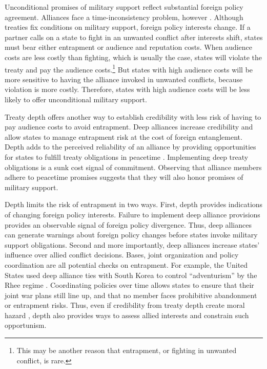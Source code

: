 \documentclass[12pt]{article}
\begin{document}
Unconditional promises of military support reflect substantial foreign policy agreement.
Alliances face a time-inconsistency problem, however \citep{LeedsSavun2007}. 
Although treaties fix conditions on military support, foreign policy interests change. 
If a partner calls on a state to fight in an unwanted conflict after interests shift, states must bear either entrapment or audience and reputation costs.
When audience costs are less costly than fighting, which is usually the case, states will violate the treaty and pay the audience costs.\footnote{This may be another reason that entrapment, or fighting in unwanted conflict, is rare.}    
But states with high audience costs will be more sensitive to having the alliance invoked in unwanted conflicts, because violation is more costly. 
Therefore, states with high audience costs will be less likely to offer unconditional military support. 


Treaty depth offers another way to establish credibility with less risk of having to pay audience costs to avoid entrapment. 
Deep alliances increase credibility and allow states to manage entrapment risk at the cost of foreign entanglement. 
Depth adds to the perceived reliability of an alliance by providing opportunities for states to fulfill treaty obligations in peacetime \citep{Morrow1994}. 
Implementing deep treaty obligations is a sunk cost signal of commitment.
Observing that alliance members adhere to peacetime promises suggests that they will also honor promises of military support. 


Depth limits the risk of entrapment in two ways. 
First, depth provides indications of changing foreign policy interests.   
Failure to implement deep alliance provisions provides an observable signal of foreign policy divergence.
Thus, deep alliances can generate warnings about foreign policy changes before states invoke military support obligations. 
Second and more importantly, deep alliances increase states' influence over allied conflict decisions.  
Bases, joint organization and policy coordination are all potential checks on entrapment.
For example, the United States used deep alliance ties with South Korea to control ``adventurism'' by the Rhee regime \citep{Cha2016}. 
Coordinating policies over time allows states to ensure that their joint war plans still line up, and that no member faces prohibitive abandonment or entrapment risks.  
Thus, even if credibility from treaty depth create moral hazard \citep{Benson2012, FuhrmannSechser2014}, depth also provides ways to assess allied interests and constrain such opportunism. 
\end{document}
